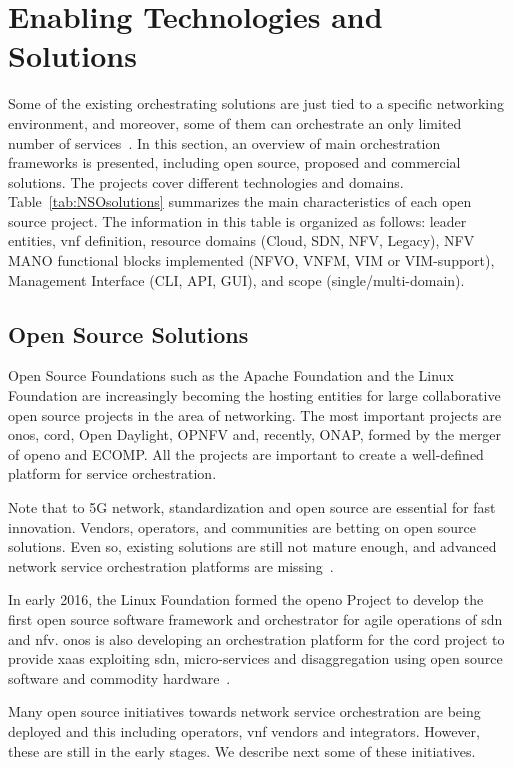 \section{Enabling Technologies and Solutions}
\label{sec:proj}
Some of the existing orchestrating solutions are just tied to a specific networking environment, and moreover, some of them can orchestrate an only limited number of services~\cite{Kuklinski2016DesignOrchestrators}. In this section, an overview of main orchestration frameworks is presented, including open source, proposed and commercial solutions. The projects cover different technologies and domains. 
Table~\ref{tab:NSOsolutions} summarizes the main characteristics of each open source project. The information in this table is organized as follows: leader entities, \gls{vnf} definition, resource domains (Cloud, SDN, NFV, Legacy), NFV MANO functional blocks implemented (NFVO, VNFM, VIM or VIM-support), Management Interface (CLI, API, GUI), and scope (single/multi-domain).

\subsection{Open Source Solutions}

Open Source Foundations such as the Apache Foundation and the Linux Foundation are increasingly becoming the hosting entities for large collaborative open source projects in the area of networking.  
The most important projects are \gls{onos}, \gls{cord}, Open Daylight, OPNFV and, recently, ONAP, formed by the merger of \gls{openo} and ECOMP. All the projects are important to create a well-defined platform for service orchestration.

Note that to 5G network, standardization and open source are essential for fast innovation. Vendors, operators, and communities are betting on open source solutions. Even so, existing solutions are still not mature enough, and advanced network service orchestration platforms are missing~\cite{Katsalis2016Multi-DomainDirections}.

In early 2016, the Linux Foundation formed the \gls{openo} Project to develop the first open source software framework and orchestrator for agile operations of \gls{sdn} and \gls{nfv}. \gls{onos} is also developing an orchestration platform for the \gls{cord} project to provide \gls{xaas} exploiting \gls{sdn}, micro-services and disaggregation using open source software and commodity hardware~\cite{Alvizu2016AdvanceEra}.

Many open source initiatives towards network service orchestration are being deployed and this including operators, \gls{vnf} vendors and integrators. However, these are still in the early stages. We describe next some of these initiatives.

